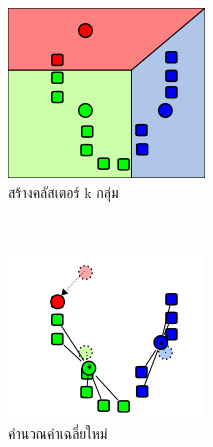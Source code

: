 \begin{figure}[H]
\begin{subfigure}{0.5\textwidth}
        \includegraphics[width=0.9\linewidth]{fig/k-means-step2.png}
        \caption{สร้างคลัสเตอร์ k กลุ่ม}
        \label{fig:k_means_step2}
    \end{subfigure}
    \\
    \vspace{1em}
    \begin{subfigure}{0.5\textwidth}
        \centering
        \includegraphics[width=0.9\linewidth]{fig/k-means-step3.png}
        \caption{คำนวณค่าเฉลี่ยใหม่}
        \label{fig:k_means_step3}
    \end{subfigure}%
    \begin{subfigure}{0.5\textwidth}

\end{subfigure}
\end{figure}
